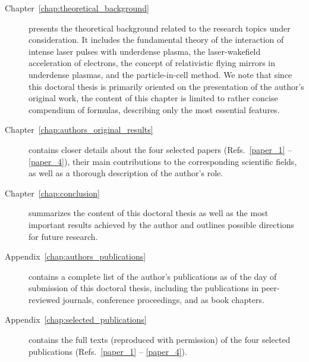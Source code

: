 \documentclass[10pt, a4paper, twoside, openright]{report}
\begin{document}
\begin{description}
	\item[Chapter~\ref{chap:theoretical_background}] presents the theoretical background related to the research topics under consideration. It includes the fundamental theory of the interaction of intense laser pulses with underdense plasma, the laser-wakefield acceleration of electrons, the concept of relativistic flying mirrors in underdense plasmas, and the particle-in-cell method. We note that since this doctoral thesis is primarily oriented on the presentation of the author's original work, the content of this chapter is limited to rather concise compendium of formulas, describing only the most essential features. 
	
	\item[Chapter~\ref{chap:authors_original_results}] contains closer details about the four selected papers (Refs.~\ref{paper_1} -- \ref{paper_4}), their main contributions to the corresponding scientific fields, as well as a thorough description of the author's role. 
	
	\item[Chapter~\ref{chap:conclusion}] summarizes the content of this doctoral thesis as well as the most important results achieved by the author and outlines possible directions for future research. 
	
	
	\item[Appendix~\ref{chap:authors_publications}] contains a complete list of the author's publications as of the day of submission of this doctoral thesis, including the publications in peer-reviewed journals, conference proceedings, and as book chapters.
	
	\item[Appendix~\ref{chap:selected_publications}] contains the full texts (reproduced with permission) of the four selected publications (Refs.~\ref{paper_1} -- \ref{paper_4}).
	
	
	
	
\end{description}
\end{document}
